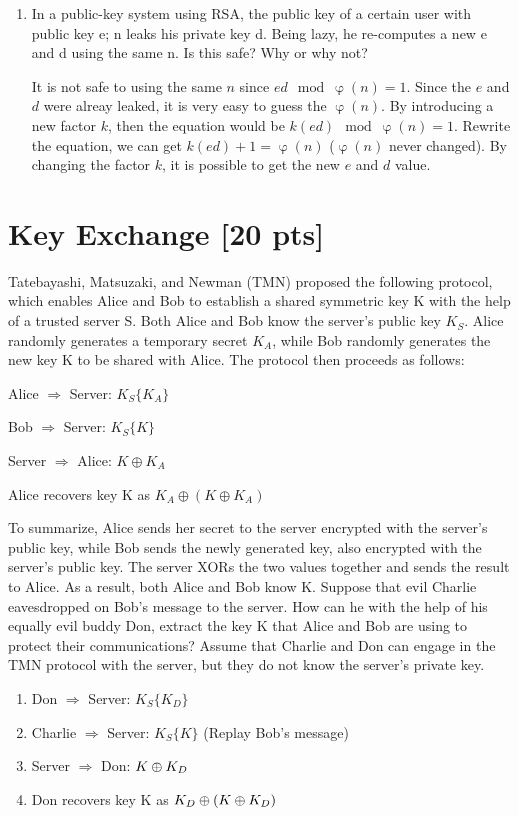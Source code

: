 \documentclass[11pt]{article}
\begin{document}
\begin{enumerate}
\item In a public-key system using RSA, the public key of a certain user with public key e; n leaks his private key d. Being lazy, he re-computes a new e and d using the same n. Is this safe? Why or why not?

It is not safe to using the same $n$ since $ed\mod\upvarphi(n) = 1$. Since the $e$ and $d$ were alreay leaked, it is very easy to guess the $\upvarphi(n)$. By introducing a new factor $k$, then the equation would be $k(ed)\mod\upvarphi(n) = 1$. Rewrite the equation, we can get $k(ed) + 1 = \upvarphi(n)$ ($\upvarphi(n)$ never changed). By changing the factor $k$, it is possible to get the new $e$ and $d$ value.

\end{enumerate}

\medskip

\section{Key Exchange [20 pts] }

Tatebayashi, Matsuzaki, and Newman (TMN) proposed the following protocol, which enables Alice and Bob to establish a shared symmetric key K with the help of a trusted server S. Both Alice and Bob know the server's public key $K_S$. Alice randomly generates a temporary secret $K_A$, while Bob randomly generates the new key K to be shared with Alice. The protocol then proceeds as follows:

   Alice $\Rightarrow$ Server:  $K_S\{K_A\}$

   Bob $\Rightarrow $ Server: $K_S\{K\}$

   Server $\Rightarrow$ Alice:  $K\oplus K_A$

   Alice recovers key K as $K_A\oplus (K\oplus K_A)$

To summarize, Alice sends her secret to the server encrypted with the server's public key, while Bob sends the newly generated key, also encrypted with the server's public key. The server XORs the two values together and sends the result to Alice. As a result, both Alice and Bob know K.
Suppose that evil Charlie eavesdropped on Bob's message to the server. How can he with the help of his equally evil buddy Don, extract the key K that Alice and Bob are using to protect their communications? Assume that Charlie and Don can engage in the TMN protocol with the server, but they do not know the server's private key.

\begin{enumerate}
  \item Don $\Rightarrow$ Server:  $K_S\{K_{D}\}$
  \item Charlie $\Rightarrow $ Server: $K_S\{K\}$ (Replay Bob's message)
  \item Server $\Rightarrow$ Don:  $K\oplus K_{D}$
  \item Don recovers key K as $K_{D}\oplus (K\oplus K_{D})$
\end{enumerate}
\end{document}
